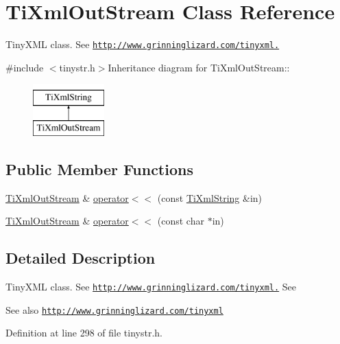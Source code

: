 \hypertarget{class_ti_xml_out_stream}{
\section{TiXmlOutStream Class Reference}
\label{class_ti_xml_out_stream}
}


TinyXML class. See \href{http://www.grinninglizard.com/tinyxml.}{\tt http://www.grinninglizard.com/tinyxml.}  


{\ttfamily \#include $<$tinystr.h$>$}Inheritance diagram for TiXmlOutStream::\begin{figure}[H]
\begin{center}
\leavevmode
\includegraphics[height=2cm]{class_ti_xml_out_stream}
\end{center}
\end{figure}
\subsection*{Public Member Functions}
\begin{DoxyCompactItemize}
\item 
\hyperlink{class_ti_xml_out_stream}{TiXmlOutStream} \& \hyperlink{class_ti_xml_out_stream_a3640dcb1c0903be3bc6966cdc9a79db6}{operator$<$$<$} (const \hyperlink{class_ti_xml_string}{TiXmlString} \&in)
\item 
\hyperlink{class_ti_xml_out_stream}{TiXmlOutStream} \& \hyperlink{class_ti_xml_out_stream_af2117e5a8cbfcb69544804ad2859bfb6}{operator$<$$<$} (const char $\ast$in)
\end{DoxyCompactItemize}


\subsection{Detailed Description}
TinyXML class. See \href{http://www.grinninglizard.com/tinyxml.}{\tt http://www.grinninglizard.com/tinyxml.} See \begin{DoxySeeAlso}{See also}
\href{http://www.grinninglizard.com/tinyxml}{\tt http://www.grinninglizard.com/tinyxml} 
\end{DoxySeeAlso}


Definition at line 298 of file tinystr.h.

